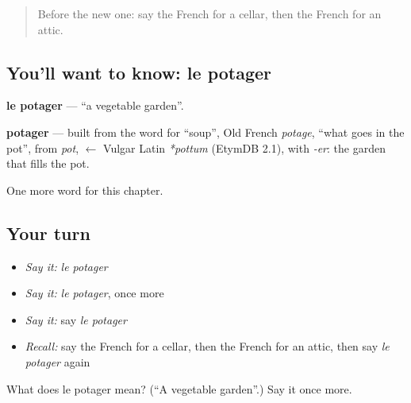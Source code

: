 \begin{quote}
Before the new one: say the French for a cellar, then the French for an attic.
\end{quote}

\subsection*{You'll want to know: le potager}
\textbf{le potager} — \textquotedblleft{}a vegetable garden\textquotedblright{}.

\begin{cousinweb}
\textbf{potager} — built from the word for \textquotedblleft{}soup\textquotedblright{}, Old French \emph{potage}, \textquotedblleft{}what goes in the pot\textquotedblright{}, from \emph{pot}, $\leftarrow$ Vulgar Latin \emph{*pottum} (EtymDB 2.1), with \emph{-er}: the garden that fills the pot.
\end{cousinweb}

\begin{grammarlens}[title={What you've built}]
One more word for this chapter.
\end{grammarlens}

\subsection*{Your turn}
\begin{itemize}
\raggedright
  \item \emph{Say it:} \emph{le potager}
  \item \emph{Say it:} \emph{le potager}, once more
  \item \emph{Say it:} say \emph{le potager}
  \item \emph{Recall:} say the French for a cellar, then the French for an attic, then say \emph{le potager} again
\end{itemize}

\begin{tcolorbox}[breakable,colback=teal!4,colframe=teal!35!black,title={Before you move on}]
What does le potager mean? (\textquotedblleft{}A vegetable garden\textquotedblright{}.) Say it once more.
\end{tcolorbox}
